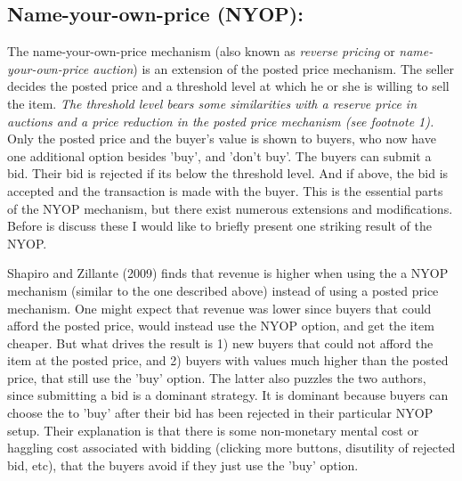 \documentclass[a4paper,12pt]{article}
\begin{document}
	\subsection{Name-your-own-price (NYOP):}

	The name-your-own-price mechanism (also known as {\it reverse pricing} or {\it name-your-own-price auction}) is an extension of the posted price mechanism. The seller decides the posted price and a threshold level at which he or she is willing to sell the item. {\it The threshold level bears some similarities with a reserve price in auctions and a price reduction in the posted price mechanism (see footnote 1).} Only the posted price and the buyer's value is shown to buyers, who now have one additional option besides 'buy', and 'don't buy'. The buyers can submit a bid. Their bid is rejected if its below the threshold level. And if above, the bid is accepted and the transaction is made with the buyer. This is the essential parts of the NYOP mechanism, but there exist numerous extensions and modifications. Before is discuss these I would like to briefly present one striking result of the NYOP.

	Shapiro and Zillante (2009) finds that revenue is higher when using the a NYOP mechanism (similar to the one described above) instead of using a posted price mechanism. One might expect that revenue was lower since buyers that could afford the posted price, would instead use the NYOP option, and get the item cheaper. But what drives the result is 1) new buyers that could not afford the item at the posted price, and 2) buyers with values much higher than the posted price, that still use the 'buy' option. The latter also puzzles the two authors, since submitting a bid is a dominant strategy. It is dominant because buyers can choose the to 'buy' after their bid has been rejected in their particular NYOP setup. Their explanation is that there is some non-monetary mental cost or haggling cost associated with bidding (clicking more buttons, disutility of rejected bid, etc), that the buyers avoid if they just use the 'buy' option.
\end{document}
